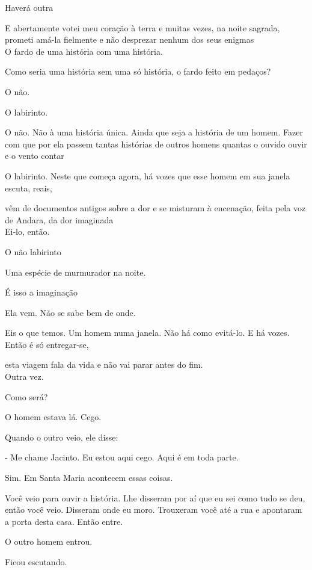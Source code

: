 Haverá outra

E abertamente votei meu coração à terra e muitas vezes, na noite
sagrada, prometi amá-la fielmente e não desprezar nenhum dos seus
enigmas\\

O fardo de uma história com uma história.

Como seria uma história sem uma só história, o fardo feito em pedaços?

O não.

O labirinto.

O não. Não à uma história única. Ainda que seja a história de um homem.
Fazer com que por ela passem tantas histórias de outros homens quantas o
ouvido ouvir e o vento contar

O labirinto. Neste que começa agora, há vozes que esse homem em sua
janela escuta, reais,

vêm de documentos antigos sobre a dor e se misturam à encenação, feita
pela voz de Andara, da dor imaginada\\

Ei-lo, então.

O não labirinto

\pagebreak

Uma espécie de murmurador na noite.

É isso a imaginação

Ela vem. Não se sabe bem de onde.

Eis o que temos. Um homem numa janela. Não há como evitá-lo. E há vozes.
Então é só entregar-se,

esta viagem fala da vida e não vai parar antes do fim.\\

Outra vez.

Como será?

\pagebreak

O homem estava lá. Cego.

Quando o outro veio, ele disse:

- Me chame Jacinto. Eu estou aqui cego. Aqui é em toda parte.

Sim. Em Santa Maria acontecem essas coisas.

Você veio para ouvir a história. Lhe disseram por aí que eu sei como
tudo se deu, então você veio. Disseram onde eu moro. Trouxeram você até
a rua e apontaram a porta desta casa. Então entre.

O outro homem entrou.

Ficou escutando.

